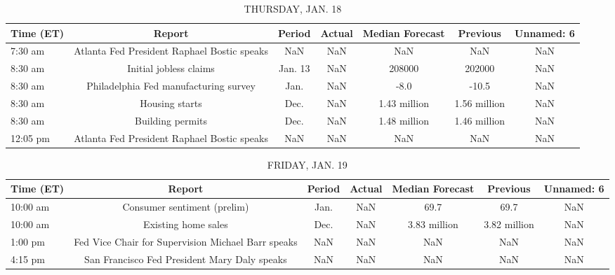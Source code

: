 \documentclass{article}%
\begin{document}
%


\begin{table}[htbp]%
\caption{THURSDAY, JAN. 18}%
\centering%
\begin{adjustbox}{width=1\textwidth}%
\begin{tabular}{lcccccc}
\toprule
Time (ET) &                                      Report &  Period & Actual & Median Forecast &     Previous & Unnamed: 6 \\
\midrule
  7:30 am & Atlanta Fed President Raphael Bostic speaks &     NaN &    NaN &             NaN &          NaN &        NaN \\
  8:30 am &                      Initial jobless claims & Jan. 13 &    NaN &          208000 &       202000 &        NaN \\
  8:30 am &       Philadelphia Fed manufacturing survey &    Jan. &    NaN &            -8.0 &        -10.5 &        NaN \\
  8:30 am &                              Housing starts &    Dec. &    NaN &    1.43 million & 1.56 million &        NaN \\
  8:30 am &                            Building permits &    Dec. &    NaN &    1.48 million & 1.46 million &        NaN \\
 12:05 pm & Atlanta Fed President Raphael Bostic speaks &     NaN &    NaN &             NaN &          NaN &        NaN \\
\bottomrule
\end{tabular}
%
\end{adjustbox}%
\end{table}

%


\begin{table}[htbp]%
\caption{FRIDAY, JAN. 19}%
\centering%
\begin{adjustbox}{width=1\textwidth}%
\begin{tabular}{lcccccc}
\toprule
Time (ET) &                                             Report & Period & Actual & Median Forecast &     Previous & Unnamed: 6 \\
\midrule
 10:00 am &                        Consumer sentiment (prelim) &   Jan. &    NaN &            69.7 &         69.7 &        NaN \\
 10:00 am &                                Existing home sales &   Dec. &    NaN &    3.83 million & 3.82 million &        NaN \\
  1:00 pm & Fed Vice Chair for Supervision Michael Barr speaks &    NaN &    NaN &             NaN &          NaN &        NaN \\
  4:15 pm &       San Francisco Fed President Mary Daly speaks &    NaN &    NaN &             NaN &          NaN &        NaN \\
\bottomrule
\end{tabular}
%
\end{adjustbox}%
\end{table}
\end{document}
